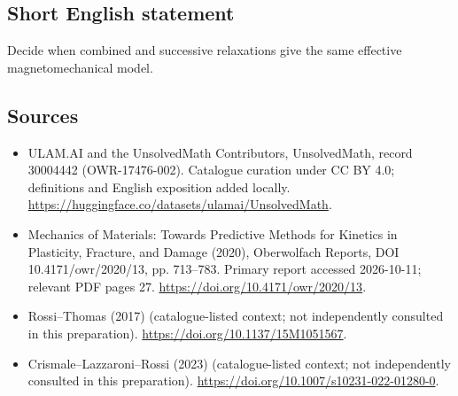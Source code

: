 \documentclass[11pt]{article}
\begin{document}
\subsection{Short English statement}
Decide when combined and successive relaxations give the same effective magnetomechanical model.
\subsection{Sources}
\begin{itemize}
\item[\hypertarget{source:30004442:1}{S1}] ULAM.AI and the UnsolvedMath Contributors, UnsolvedMath, record 30004442 (OWR-17476-002). Catalogue curation under CC BY 4.0; definitions and English exposition added locally.
\url{https://huggingface.co/datasets/ulamai/UnsolvedMath}.
\item[\hypertarget{source:30004442:2}{S2}] Mechanics of Materials: Towards Predictive Methods for Kinetics in Plasticity, Fracture, and Damage (2020), Oberwolfach Reports, DOI 10.4171/owr/2020/13, pp. 713--783. Primary report accessed 2026-10-11; relevant PDF pages 27.
\url{https://doi.org/10.4171/owr/2020/13}.
\item[\hypertarget{source:30004442:3}{S3}] Rossi--Thomas (2017) (catalogue-listed context; not independently consulted in this preparation).
\url{https://doi.org/10.1137/15M1051567}.
\item[\hypertarget{source:30004442:4}{S4}] Crismale--Lazzaroni--Rossi (2023) (catalogue-listed context; not independently consulted in this preparation).
\url{https://doi.org/10.1007/s10231-022-01280-0}.
\end{itemize}
\label{end:30004442}
\end{document}
